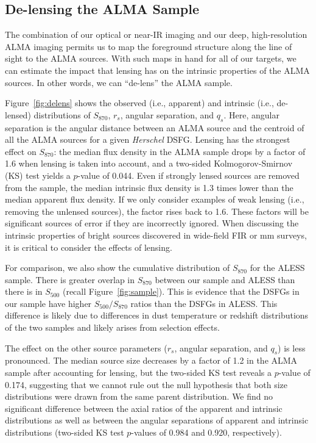 \documentclass[iop]{emulateapj}
\begin{document}
\subsection{De-lensing the ALMA Sample}\label{sec:lensing}

The combination of our optical or near-IR imaging and our deep, high-resolution
ALMA imaging permits us to map the foreground structure along the line of sight
to the ALMA sources.  With such maps in hand for all of our targets, we can
estimate the impact that lensing has on the intrinsic properties of the ALMA
sources.  In other words, we can ``de-lens'' the ALMA sample.

Figure~\ref{fig:delens} shows the observed (i.e., apparent) and intrinsic
(i.e., de-lensed) distributions of $S_{870}$, $r_s$, angular separation, and
$q_s$.  Here, angular separation is the angular distance between an ALMA source
and the centroid of all the ALMA sources for a given {\it Herschel} DSFG.
Lensing has the strongest effect on $S_{870}$: the median flux density in the
ALMA sample drops by a factor of 1.6 when lensing is taken into account, and a
two-sided Kolmogorov-Smirnov (KS) test yields a $p$-value of 0.044.  Even
if strongly lensed sources are removed from the sample, the median intrinsic
flux density is 1.3 times lower than the median apparent flux density.  If we
only consider examples of weak lensing (i.e., removing the unlensed sources),
the factor rises back to 1.6.  These factors will be significant sources of
error if they are incorrectly ignored.  When discussing the intrinsic
properties of bright sources discovered in wide-field FIR or mm surveys, it
is critical to consider the effects of lensing.

For comparison, we also show the cumulative distribution of $S_{870}$ for the
ALESS sample.  There is greater overlap in $S_{870}$ between our sample and
ALESS than there is in $S_{500}$ (recall Figure~\ref{fig:sample}).  This is
evidence that the DSFGs in our sample have higher $S_{500}/S_{870}$ ratios than
the DSFGs in ALESS.  This difference is likely due to differences in dust
temperature or redshift distributions of the two samples and likely arises from
selection effects.

The effect on the other source parameters ($r_s$, angular separation, and
$q_s$) is less pronounced.  The median source size decreases by a factor of 1.2
in the ALMA sample after accounting for lensing, but the two-sided KS test
reveals a $p$-value of 0.174, suggesting that we cannot rule out the null
hypothesis that both size distributions were drawn from the same parent
distribution.  We find no significant difference between the axial ratios of
the apparent and intrinsic distributions as well as between the angular
separations of apparent and intrinsic distributions (two-sided KS test
$p$-values of 0.984 and 0.920, respectively). 
\end{document}
